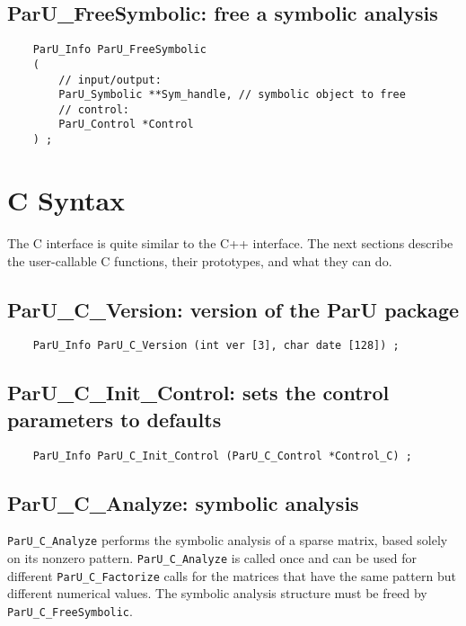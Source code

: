 \documentclass[12pt]{article}
\begin{document}
\subsection{{\sf ParU\_FreeSymbolic}: free a symbolic analysis}

    {\footnotesize
    \begin{verbatim}
    ParU_Info ParU_FreeSymbolic
    (
        // input/output:
        ParU_Symbolic **Sym_handle, // symbolic object to free
        // control:
        ParU_Control *Control
    ) ; \end{verbatim} }

\section{C Syntax}

The C interface is quite similar to the C++ interface.  The next sections
describe the user-callable C functions, their prototypes, and what they can do.

\subsection{{\sf ParU\_C\_Version}: version of the ParU package}

    {\footnotesize
    \begin{verbatim}
    ParU_Info ParU_C_Version (int ver [3], char date [128]) ; \end{verbatim} }

\subsection{{\sf ParU\_C\_Init\_Control}: sets the control parameters to defaults}

    {\footnotesize
    \begin{verbatim}
    ParU_Info ParU_C_Init_Control (ParU_C_Control *Control_C) ; \end{verbatim} }

\subsection{{\sf ParU\_C\_Analyze}: symbolic analysis}

    \verb'ParU_C_Analyze' performs the symbolic analysis of a sparse
        matrix, based solely on its nonzero pattern.  \verb'ParU_C_Analyze' is
        called once and can be used for different \verb'ParU_C_Factorize' calls
        for the matrices that have the same pattern but different numerical
        values.
        The symbolic analysis structure must be freed by \verb'ParU_C_FreeSymbolic'.
\end{document}
